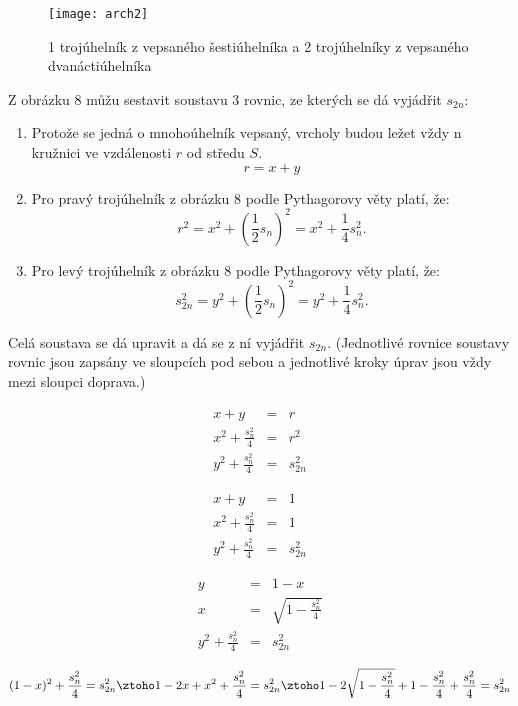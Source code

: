 \documentclass[soc]{gzwroc} %
\begin{document}
\begin{figure}[!ht]
\texttt{[image: arch2]}
\caption{1 trojúhelník z vepsaného šestiúhelníka a 2 trojúhelníky z vepsaného dvanáctiúhelníka}
\label{fig:kruh}
\end{figure}
Z obrázku 8 můžu sestavit soustavu 3 rovnic, ze kterých se dá vyjádřit $s_{2n}$:
\begin{enumerate}
\item Protože se jedná o mnohoúhelník vepsaný, vrcholy budou ležet vždy n kružnici ve vzdálenosti $r$ od středu $S$.
$$
r = x+y
$$
\item Pro pravý trojúhelník z obrázku 8 podle Pythagorovy věty platí, že:
$$
r^2=x^2+\left(\frac{1}{2}s_n\right)^2=x^2+\frac{1}{4}s_n^2.
$$
\item Pro levý trojúhelník z obrázku 8 podle Pythagorovy věty platí, že:
$$
s_{2n}^2=y^2+\left(\frac{1}{2}s_n\right)^2=y^2+\frac{1}{4}s_n^2.
$$
\end{enumerate}
Celá soustava se dá upravit a dá se z ní vyjádřit $s_{2n}$. (Jednotlivé rovnice soustavy rovnic jsou zapsány ve sloupcích pod sebou a jednotlivé kroky úprav jsou vždy mezi sloupci doprava.)
\begin{minipage}[t]{0.3\textwidth}
\begin{eqnarray}
x+y &=& r \nonumber \\
x^2+\frac{s_n^2}{4}&=&r^2\nonumber\\
y^2+\frac{s_n^2}{4}&=&s_{2n}^2\nonumber
\end{eqnarray}
\end{minipage}\hfill
\begin{minipage}[t]{0.3\textwidth}
\begin{eqnarray}
x+y &=& 1 \nonumber \\
x^2+\frac{s_n^2}{4}&=&1\nonumber\\
y^2+\frac{s_n^2}{4}&=&s_{2n}^2\nonumber
\end{eqnarray}
\end{minipage}\hfill
\begin{minipage}[t]{0.3\textwidth}
\begin{eqnarray}
y &=& 1-x \nonumber \\
x&=&\sqrt{1-\frac{s_n^2}{4}}\nonumber\\
y^2+\frac{s_n^2}{4}&=&s_{2n}^2\nonumber
\end{eqnarray}
\end{minipage}\hfill
$$
(1-x)^2+\frac{s_n^2}{4}=s_{2n}^2 \ztoho 1-2x+x^2+\frac{s_n^2}{4}=s_{2n}^2 \ztoho 1-2\sqrt{1-\frac{s_n^2}{4}}+1-\frac{s_n^2}{4}+\frac{s_n^2}{4}=s_{2n}^2
$$
\end{document}
